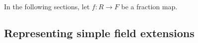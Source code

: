 \documentclass[a4paper,USenglish,cleveref, autoref, thm-restate]{lipics-v2021}
\newcommand{\lean}[1]{\texttt{#1}\xspace} %
\newcommand{\mathlib}{\textsf{mathlib}\xspace}
\newcommand{\Q}{\mathbb{Q}}
\newcommand{\Z}{\mathbb{Z}}
\begin{document}
In the following sections, let $f \colon R \to F$ be a fraction map.

%
%
%
%
%
%
%

\subsection{Representing simple field extensions} \label{sec:simple-field-extension}
\end{document}
